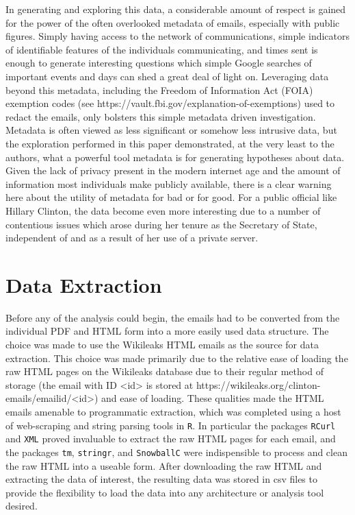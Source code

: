 \documentclass[journal]{vgtc}                %
\begin{document}
In generating and exploring this data, a considerable amount of respect is gained for the power of the often overlooked metadata of emails, especially with public figures. Simply having access to the network of communications, simple indicators of identifiable features of the individuals communicating, and times sent is enough to generate interesting questions which simple Google searches of important events and days can shed a great deal of light on. Leveraging data beyond this metadata, including the Freedom of Information Act (FOIA) exemption codes (see https://vault.fbi.gov/explanation-of-exemptions) used to redact the emails, only bolsters this simple metadata driven investigation. Metadata is often viewed as less significant or somehow less intrusive data, but the exploration performed in this paper demonstrated, at the very least to the authors, what a powerful tool metadata is for generating hypotheses about data. Given the lack of privacy present in the modern internet age and the amount of information most individuals make publicly available, there is a clear warning here about the utility of metadata for bad or for good. For a public official like Hillary Clinton, the data become even more interesting due to a number of contentious issues which arose during her tenure as the Secretary of State, independent of and as a result of her use of a private server.

\section{Data Extraction}

Before any of the analysis could begin, the emails had to be converted from the individual PDF and HTML form into a more easily used data structure. The choice was made to use the Wikileaks HTML emails as the source for data extraction. This choice was made primarily due to the relative ease of loading the raw HTML pages on the Wikileaks database due to their regular method of storage (the email with ID <id> is stored at https://wikileaks.org/clinton-emails/emailid/<id>) and ease of loading. These qualities made the HTML emails amenable to programmatic extraction, which was completed using a host of web-scraping and string parsing tools in \texttt{R}. In particular the packages \texttt{RCurl} and \texttt{XML} proved invaluable to extract the raw HTML pages for each email, and the packages \texttt{tm}, \texttt{stringr}, and \texttt{SnowballC} were indispensible to process and clean the raw HTML into a useable form. After downloading the raw HTML and extracting the data of interest, the resulting data was stored in csv files to provide the flexibility to load the data into any architecture or analysis tool desired.
\end{document}
